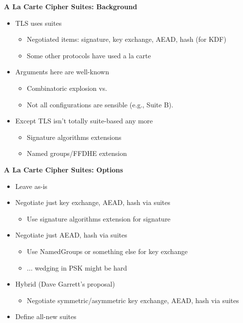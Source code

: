 \documentclass[helvetica]{seminar}
\newcommand{\heading}[1]{%
  \begin{center} 
    \large\bf 
    #1 
  \end{center} 
  \vspace{.4 in}}
\begin{document}
\begin{slide}
\heading{A La Carte Cipher Suites: Background}

\begin{itemize}
\item TLS uses suites
  \begin{itemize}
  \item Negotiated items: signature, key exchange, AEAD, hash (for KDF)
  \item Some other protocols have used a la carte
  \end{itemize}

\item Arguments here are well-known
  \begin{itemize}
  \item Combinatoric explosion vs.
  \item Not all configurations are sensible (e.g., Suite B).
  \end{itemize}

\item Except TLS isn't totally suite-based any more
  \begin{itemize}
  \item Signature algorithms extensions
  \item Named groups/FFDHE extension
  \end{itemize}
\end{itemize}
\end{slide}


\begin{slide}
\heading{A La Carte Cipher Suites: Options}

\begin{itemize}
\item Leave as-is
\item Negotiate just key exchange, AEAD, hash via suites
  \begin{itemize}
  \item Use signature algorithms extension for signature
  \end{itemize}
\item Negotiate just AEAD, hash via suites
  \begin{itemize}
  \item Use NamedGroups or something else for key exchange
  \item ... wedging in PSK might be hard
  \end{itemize}
\item Hybrid (Dave Garrett's proposal)
  \begin{itemize}
  \item Negotiate symmetric/asymmetric key exchange, AEAD, hash via suites
  \end{itemize}

\item Define all-new suites
\end{itemize}
\end{slide}
\end{document}
